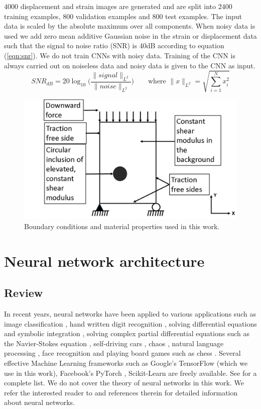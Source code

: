 \documentclass[12pt]{article}
\begin{document}
$4000$ displacement and strain images are generated and are split into $2400$ training examples, $800$ validation examples and $800$ test examples. The input data is scaled by the absolute maximum over all components. When noisy data is used we add zero mean additive Gaussian noise in the strain or displacement data such that the signal to noise ratio (SNR) is 40dB according to equation (\ref{eqn:snr}). We do not train CNNs with noisy data. Training of the CNN is always carried out on noiseless data and noisy data is given to the CNN as input. 
\begin{equation}
  \label{eqn:snr}
  SNR_{dB} = 20\log_{10}{\Bigg (}\frac{\|signal\|_{L^2}}{\|noise\|_{L^2}}{\Bigg )} \qquad \text{where}\,\, \|x\|_{L^2} = \sqrt{\sum_{i=1}^{N}x_i^2} 
\end{equation}
%
\begin{figure}[h] 
   \centering
    \includegraphics[totalheight=5cm]{Figures/bc.png}
  \caption{\label{fig:bc}Boundary conditions and material properties used in this work. }
\end{figure}
%
\section{Neural network architecture}
\subsection{Review}
In recent years, neural networks have been applied to various applications such as image classification \cite{paper:hinton2017}, hand written digit recognition \cite{paper:kulkarni2018}, solving differential equations and symbolic integration \cite{misc:lample2019}, solving complex partial differential equations such as the Navier-Stokes equation \cite{misc:anandkumar2020}, self-driving cars \cite{misc:agnihotri2019,misc:nvidiaselfdriving2016}, chaos \cite{paper:pathak2018}, natural language processing \cite{misc:googlenlp}, face recognition \cite{conf:taigman2014} and playing board games such as chess \cite{paper:alphazero}. Several effective Machine Learning frameworks such as Google's TensorFlow \cite{misc:tensorflow} (which we use in this work), Facebook's PyTorch \cite{incollect:pytorch}, Scikit-Learn \cite{paper:scikit-learn} are freely available. See \cite{misc:compdeep} for a complete list. We do not cover the theory of neural networks in this work. We refer the interested reader to \cite{book:aggarwal,book:goodfellow,book:chollet,misc:cs231n,misc:andrewng,misc:udemy} and references therein for detailed information about neural networks.
\end{document}
